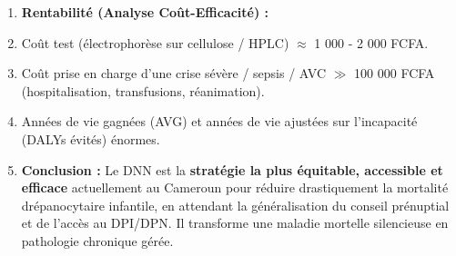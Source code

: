 \documentclass[11pt]{article}
\begin{document}
\begin{exoresolu}
\begin{enumerate}
              \begin{itemize}
                  \item \textbf{Prophylaxie pénicilline V orale (dès 2 mois jusqu'à 5 ans minimum) :} Réduit le risque de sepsis pneumococcique invasif de \textbf{84\%} (Étude PROPS, NEJM 1986). \textbf{Mesure salvatrice n°1, coût dérisoire.}
                  \item \textbf{Vaccination anti-pneumococcique conjuguée (PCV13/PCV10) et anti-\emph{Haemophilus influenzae} b :} Renforce la protection (calendrier EPI élargi).
                  \item \textbf{Suivi spécialisé en Centre de Drépanocytose (ex: Hôpital Mère-Enfant Fondation Chantal Biya, Hôpital Laquintinie, Hôpital Général de Douala) :} Éducation parents (reconnaître fièvre $>38,5^\circ$C = urgence, palpation rate, déshydratation), hydroxyurée (dès 9 mois si forme sévère) $\rightarrow$ augmentation HbF, réduction crises, AVC, transfusions.
                  \item \textbf{Détection des porteurs (AS) :} Information pour la fratrie future (conseil génétique différé).
              \end{itemize}
        \item \textbf{Rentabilité (Analyse Coût-Efficacité) :}
              \item Coût test (électrophorèse sur cellulose / HPLC) $\approx$ 1 000 - 2 000 FCFA.
              \item Coût prise en charge d'une crise sévère / sepsis / AVC $\gg$ 100 000 FCFA (hospitalisation, transfusions, réanimation).
              \item Années de vie gagnées (AVG) et années de vie ajustées sur l'incapacité (DALYs évités) énormes.
        \item \textbf{Conclusion :} Le DNN est la \textbf{stratégie la plus équitable, accessible et efficace} actuellement au Cameroun pour réduire drastiquement la mortalité drépanocytaire infantile, en attendant la généralisation du conseil prénuptial et de l'accès au DPI/DPN. Il transforme une maladie mortelle silencieuse en pathologie chronique gérée.
    \end{enumerate}
\end{exoresolu}
\end{document}
